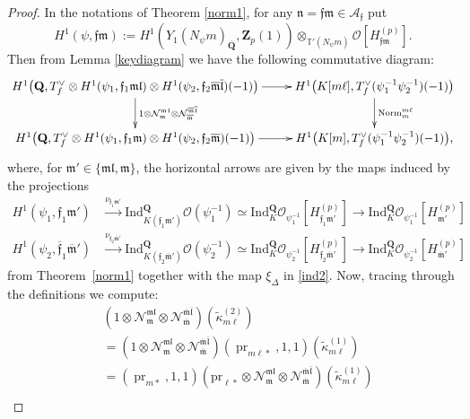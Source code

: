 \documentclass[10pt,letterpaper]{amsart}
\theoremstyle{plain}
\theoremstyle{definition}
\theoremstyle{definition}
\theoremstyle{plain}
\theoremstyle{plain}
\theoremstyle{plain}
\theoremstyle{remark}
\numberwithin{equation}{section}
\newcommand{\fkm}{\mathfrak{m}}
\newcommand{\fkmbar}{\overline{\mathfrak{m}}}
\newcommand{\fkf}{\mathfrak{f}}
\newcommand{\fkfbar}{\overline{\mathfrak{f}}}
\newcommand{\fkl}{\mathfrak{l}}
\newcommand{\fklbar}{\overline{\mathfrak{l}}}
\newcommand{\fkn}{\mathfrak{n}}
\DeclareMathOperator{\et}{\acute{e}t}
\DeclareMathOperator{\tpr}{\text{pr}}
\def\cO{\mathcal O}
\newcommand{\Q}{\mathbf{Q}}
\newcommand{\Z}{\mathbf{Z}}
\begin{document}
\begin{proof}
In the notations of Theorem \ref{norm1}, for any $\fkn=\fkf\fkm\in\mathcal{A}_\fkf$ put
\[
H^1(\psi,\fkf\fkm):=H^1_{\et}(Y_1(N_{\psi}m)_{\overline{\Q}},\Z_p(1))\otimes_{\mathbb{T}'(N_{\psi}m)}\mathcal{O}[H_{\mathfrak{f}\fkm}^{(p)}].
\]
Then from Lemma \ref{keydiagram} we have the following commutative diagram:
\begin{equation}\label{norm5}
\begin{aligned}
    \xymatrix{
H^1\bigl(\Q,T_f^\vee\otimes H^1(\psi_1,\fkf_1\fkm\fkl)\otimes H^1(\psi_2,\fkf_2\fkmbar\fklbar)(-1)\bigr) \ar[d]^{1\otimes \mathcal{N}^{\fkm\fkl}_{\fkm}\otimes\mathcal{N}^{\fkmbar\fklbar}_{\fkmbar}} \ar[r] &H^1\bigl(K[m\ell],T_f^{\vee}(\psi_{1}^{-1}\psi_{2}^{-1})(-1)\bigr) \ar[d]^{\mathrm{Norm}^{m\ell}_{m}} \\
 H^1\bigl(\Q,T_f^\vee\otimes H^1(\psi_1,\fkf_1\fkm)\otimes H^1(\psi_2,\fkf_2\fkmbar)(-1)\bigr)
\ar[r] & H^1\bigl(K[m],T_f^{\vee}(\psi_{1}^{-1}\psi_{2}^{-1})(-1)\bigr),}
\end{aligned}
\end{equation}
where, for $\fkm'\in\{\fkm\fkl,\fkm\}$, the horizontal arrows are given by the maps induced by the projections
\begin{align*}
H^1(\psi_1,\fkf_1\fkm')&\xrightarrow{\nu_{\fkf_1\fkm'}}{\mathrm{Ind}}_{K(\fkf_1\fkm')}^\Q\cO(\psi_1^{-1})\simeq {\mathrm{Ind}}_K^\Q\cO_{\psi_1^{-1}}[H_{\fkf_1\fkm'}^{(p)}]\longrightarrow 
{\mathrm{Ind}}_K^\Q\cO_{\psi_1^{-1}}[H_{\fkm'}^{(p)}]\\
H^1(\psi_2,\fkfbar_1\fkmbar')&\xrightarrow{\nu_{\fkf_2\fkmbar'}}{\mathrm{Ind}}_{K(\fkf_2\fkmbar')}^\Q\cO(\psi_2^{-1})\simeq {\mathrm{Ind}}_K^\Q\cO_{\psi_2^{-1}}[H_{\fkf_2\fkmbar'}^{(p)}]\longrightarrow {\mathrm{Ind}}_K^\Q\cO_{\psi_2^{-1}}[H_{\fkmbar'}^{(p)}]
\end{align*}
from Theorem~\ref{norm1} together with the map $\xi_\Delta$ in \eqref{ind2}. Now, tracing through the definitions we compute:
\begin{align*}
&(1\otimes\mathcal{N}_{\fkm}^{\mathfrak{ml}}\otimes\mathcal{N}_{\fkmbar}^{\fkmbar\fklbar})(\tilde{\kappa}^{(2)}_{m\ell})\\
&=(1\otimes\mathcal{N}_{\fkm}^{\mathfrak{ml}}\otimes\mathcal{N}_{\fkmbar}^{\fkmbar\fklbar})(\tpr_{m\ell*},1,1)(\tilde{\kappa}^{(1)}_{m\ell}) \\
&=(\tpr_{m*},1,1)(\text{pr}_{\ell*}\otimes \mathcal{N}_{\fkm}^{\mathfrak{ml}}\otimes\mathcal{N}_{\fkmbar}^{\fkmbar\fklbar})(\tilde{\kappa}^{(1)}_{m\ell})\\

\end{align*}
\end{proof}
\end{document}
